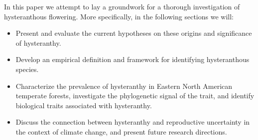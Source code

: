 \documentclass{article}
\begin{document}
\indent In this paper we attempt to lay a groundwork for a thorough investigation of hysteranthous flowering. More specifically, in the following sections we will:
\begin{itemize}
\item Present and evaluate the current hypotheses on these origins and significance of hysteranthy. 
\item Develop an empirical definition and framework for identifying hysteranthous species.
\item Characterize the prevalence of hysteranthy in Eastern North American temperate forests, investigate the phylogenetic signal of the trait, and identify biological traits associated with hysteranthy.
\item  Discuss the connection between hysteranthy and reproductive uncertainty in the context of climate change, and present future research directions.
\end{itemize}
\end{document}
